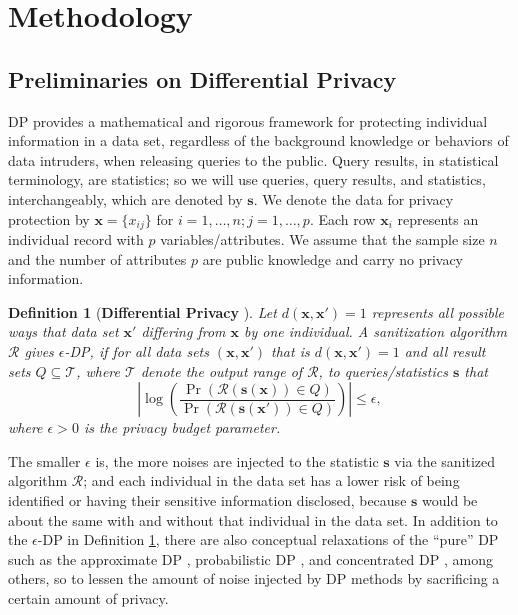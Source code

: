 \documentclass[12pt, A4]{article}
\newcommand{\R}{\mathcal{R}}
\newcommand{\T}{\mathcal{T}}
\newcommand{\x}{\mathbf{x}}
\newcommand{\s}{\mathbf{s}}
\theoremstyle{plain}
\theoremstyle{exampstyle}\newtheorem{defn}{Definition}
\theoremstyle{exampstyle}\newtheorem{lem}{Lemma}
\theoremstyle{exampstyle}\newtheorem{cor}{Corollary}
\theoremstyle{exampstyle}\newtheorem{pro}{Proposition}
\theoremstyle{exampstyle}\newtheorem{cla}{Claim}
\theoremstyle{exampstyle}\newtheorem{rem}{Remark}
\begin{document}
\section{Methodology}\label{sec:methodology}
\subsection{Preliminaries on Differential Privacy}
DP provides a mathematical and rigorous framework for protecting individual information in a data set, regardless of the background knowledge or behaviors of data intruders, when releasing queries to the public. Query results, in statistical terminology, are statistics; so we will use queries, query results, and statistics, interchangeably, which are denoted by $\s$. We denote the data for privacy protection by $\x=\{x_{ij}\}$ for $i=1,\ldots,n;j=1,\ldots,p$. Each row  $\x_i$ represents an individual record with $p$ variables/attributes. We assume that the sample size $n$ and the number of attributes $p$ are public knowledge and carry no privacy information.
\begin{defn}[\textbf{Differential Privacy} \citep{dwork2006calibrating}]\label{def:dp}
Let $d(\x,\x')=1$ represents all possible ways that data set $\x'$ differing from $\x$ by one individual. A sanitization algorithm $\R$ gives $\epsilon$-DP, if for all data sets $(\x,\x')$ that is $d(\x,\x')=1$ and all result sets $Q\subseteq \T$, where  $\T$ denote the output range of $\R$,  to queries/statistics $\s$ that
\begin{equation}\label{eqn:dp}
\left|\log\left(\frac{\Pr(\R( \s(\x)) \in Q)}{\Pr(\R( \s(\x'))\in Q)} \right)\right|\le\epsilon,
\end{equation}
\noindent where  $\epsilon>0$ is the privacy budget parameter.
\end{defn}
The smaller $\epsilon$ is, the more noises are injected to the statistic $\s$ via the sanitized algorithm $\R$; and each individual in the data set has a lower risk of being identified or having their sensitive information disclosed, because $\s$ would be about the same with and without that individual in the data set. In addition to the $\epsilon$-DP in Definition \ref{def:dp}, there are also  conceptual relaxations of the ``pure'' DP such as the approximate DP \citep{dwork2013algorithmic}, probabilistic DP \citep{machanavajjhala2008privacy}, and concentrated DP \citep{dwork2016concentrated}, among others, so to lessen the amount of noise injected by DP methods by sacrificing a certain amount of privacy.
\end{document}
